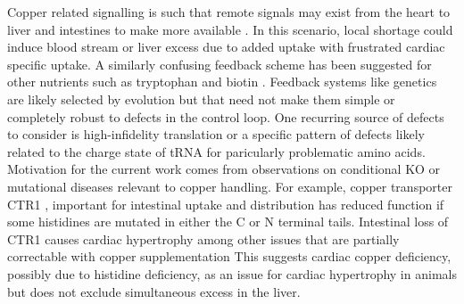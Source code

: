 \documentclass[aps,secnumarabic,balancelastpage,amsmath,amssymb,nofootinbib]{revtex4}
\begin{document}
Copper related signalling is such that remote signals may exist from the heart
to liver and intestines to make more available
\cite{Kim_Turski_Nose_Cardiac_Copper_Deficiency_Activates_2010}
\cite{xxx_Mechanism_regulation_2010}. In this scenario, local
shortage could induce blood stream or liver excess due to added
uptake with frustrated  cardiac specific uptake.
A similarly confusing  feedback scheme 
has been suggested for other nutrients such as tryptophan
\cite{mmarchywka-MJM-2021-007-.1-table-rg}
and biotin
\cite{marchywka-MJM-2022-010-0.80}
\cite{marchywka-MJM-2021-015-0.50-rg}
.  Feedback systems like genetics are likely 
selected by evolution but that need not make them simple
or  completely robust to defects in the control loop.
One recurring source of defects to consider is  high-infidelity
translation or a specific pattern of defects likely related
to the charge state of tRNA   for paricularly problematic
amino acids.   
Motivation for the current work comes from observations on
conditional KO or mutational diseases relevant to copper handling. 
For example, copper transporter CTR1 , important for
intestinal uptake  
\cite{Nose_Kim_Thiele_Ctr1_drives_intestinal_copper_2006}
and distribution  
\cite{Lee_Prohaska_Thiele_Essential_role_mammalian_2001}
\cite{PMC9759326}
\cite{PMC34439}
has  reduced function  if some
histidines are mutated in either the C or N terminal tails. 
Intestinal loss of CTR1 causes cardiac hypertrophy
among other issues that are partially correctable with copper supplementation
\cite{Nose_Kim_Thiele_Ctr1_drives_intestinal_copper_2006}
This suggests cardiac copper deficiency, possibly due to histidine 
deficiency,  as an issue for cardiac hypertrophy 
in animals but does not exclude simultaneous excess in the liver.
\end{document}
